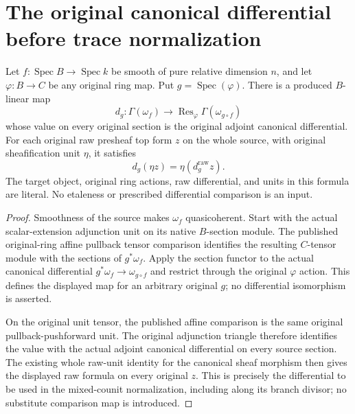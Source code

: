 \section{The original canonical differential before trace normalization}

\begin{lemma}
\label{lem:kn-global-trace-native-branch-differential}
\leanok
Let $f:\operatorname{Spec}B\to\operatorname{Spec}k$ be smooth of pure
relative dimension $n$, and let $\varphi:B\to C$ be any original ring map.
Put $g=\operatorname{Spec}(\varphi)$.  There is a produced $B$-linear map
\[
 d_g:\Gamma(\omega_f)\longrightarrow
      \operatorname{Res}_{\varphi}\Gamma(\omega_{g\circ f})
\]
whose value on every original section is the original adjoint canonical
differential.  For each original raw presheaf top form $z$ on the whole
source, with original sheafification unit $\eta$, it satisfies
\[
 d_g(\eta z)=\eta(d_g^{\mathrm{raw}}z).
\]
The target object, original ring actions, raw differential, and units in
this formula are literal.  No etaleness or prescribed differential
comparison is an input.
\end{lemma}
\begin{proof}
Smoothness of the source makes $\omega_f$ quasicoherent.  Start with the
actual scalar-extension adjunction unit on its native $B$-section module.
The published original-ring affine pullback tensor comparison identifies
the resulting $C$-tensor module with the sections of $g^*\omega_f$.
Apply the section functor to the actual canonical differential
$g^*\omega_f\to\omega_{g\circ f}$ and restrict through the original
$\varphi$ action.  This defines the displayed map for an arbitrary
original $g$; no differential isomorphism is asserted.

On the original unit tensor, the published affine comparison is the
same original pullback-pushforward unit.  The original adjunction triangle
therefore identifies the value with the actual adjoint canonical
differential on every source section.  The existing whole raw-unit
identity for the canonical sheaf morphism then gives the displayed raw
formula on every original $z$.  This is precisely the differential to
be used in the mixed-counit normalization, including along its branch
divisor; no substitute comparison map is introduced.
\end{proof}


